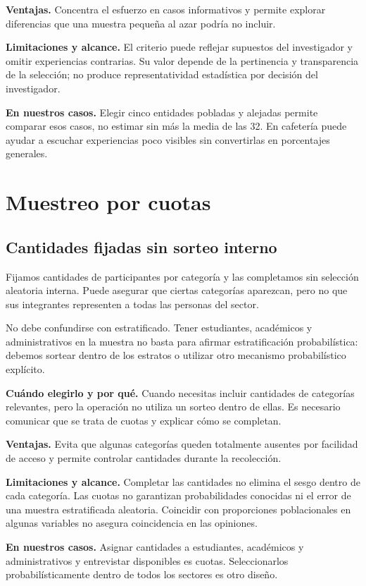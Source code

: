 \documentclass[11pt,letterpaper]{article}
\begin{document}
\textbf{Ventajas.} Concentra el esfuerzo en casos informativos y permite explorar diferencias que una muestra pequeña al azar podría no incluir.

\textbf{Limitaciones y alcance.} El criterio puede reflejar supuestos del investigador y omitir experiencias contrarias. Su valor depende de la pertinencia y transparencia de la selección; no produce representatividad estadística por decisión del investigador.

\textbf{En nuestros casos.} Elegir cinco entidades pobladas y alejadas permite comparar esos casos, no estimar sin más la media de las 32. En cafetería puede ayudar a escuchar experiencias poco visibles sin convertirlas en porcentajes generales.
\section{Muestreo por cuotas}

\subsection{Cantidades fijadas sin sorteo interno}
Fijamos cantidades de participantes por categoría y las completamos sin selección aleatoria interna. Puede asegurar que ciertas categorías aparezcan, pero no que sus integrantes representen a todas las personas del sector.

No debe confundirse con estratificado. Tener estudiantes, académicos y administrativos en la muestra no basta para afirmar estratificación probabilística: debemos sortear dentro de los estratos o utilizar otro mecanismo probabilístico explícito.

\textbf{Cuándo elegirlo y por qué.} Cuando necesitas incluir cantidades de categorías relevantes, pero la operación no utiliza un sorteo dentro de ellas. Es necesario comunicar que se trata de cuotas y explicar cómo se completan.

\textbf{Ventajas.} Evita que algunas categorías queden totalmente ausentes por facilidad de acceso y permite controlar cantidades durante la recolección.

\textbf{Limitaciones y alcance.} Completar las cantidades no elimina el sesgo dentro de cada categoría. Las cuotas no garantizan probabilidades conocidas ni el error de una muestra estratificada aleatoria. Coincidir con proporciones poblacionales en algunas variables no asegura coincidencia en las opiniones.

\textbf{En nuestros casos.} Asignar cantidades a estudiantes, académicos y administrativos y entrevistar disponibles es cuotas. Seleccionarlos probabilísticamente dentro de todos los sectores es otro diseño.
\clearpage
\end{document}
